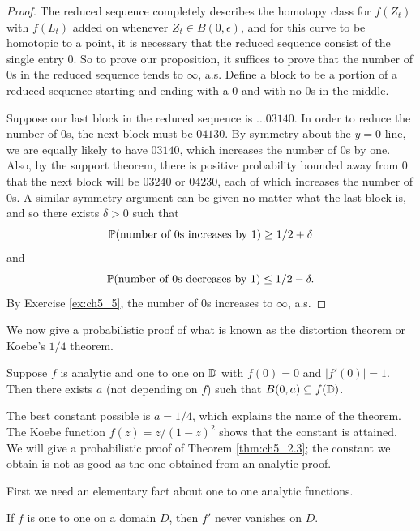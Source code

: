 \begin{proof}
The reduced sequence completely describes the homotopy class for $f(Z_t)$ with $f(L_t)$ added on whenever $Z_t \in B(0,\epsilon)$, and for this curve to be homotopic to a point, it is necessary that the reduced sequence consist of the single entry $0$. So to prove our proposition, it suffices to prove that the number of $0$s in the reduced sequence tends to $\infty$, a.s. Define a block to be a portion of a reduced sequence starting and ending with a $0$ and with no $0$s in the middle.

Suppose our last block in the reduced sequence is $\ldots 03140$. In order to reduce the number of $0$s, the next block must be $04130$. By symmetry about the $y = 0$ line, we are equally likely to have $03140$, which increases the number of $0$s by one. Also, by the support theorem, there is positive probability bounded away from $0$ that the next block will be $03240$ or $04230$, each of which increases the number of $0$s. A similar symmetry argument can be given no matter what the last block is, and so there exists $\delta > 0$ such that
\[
    \P(\text{number of $0$s increases by}~1) \geq 1/2 + \delta
\]
and
\[
    \P(\text{number of $0$s decreases by}~1) \leq 1/2 - \delta.
\]
By Exercise \ref{ex:ch5_5}, the number of 0s increases to $\infty$, a.s.
\end{proof}



We now give a probabilistic proof of what is known as the distortion theorem or Koebe's $1/4$ theorem.

\begin{theorem}\label{thm:ch5_2.3}
Suppose $f$ is analytic and one to one on $\D$ with $f(0) = 0$ and $|f'(0)| = 1$. Then there exists $a$ (not depending on $f$) such that $B(0,a) \subseteq \allowbreak f(\D)$.
\end{theorem}

The best constant possible is $a = 1/4$, which explains the name of the theorem. The Koebe function $f(z) = z/(1-z)^2$ shows that the constant is attained. We will give a probabilistic proof of Theorem \ref{thm:ch5_2.3}; the constant we obtain is not as good as the one obtained from an analytic proof.

First we need an elementary fact about one to one analytic functions.

\begin{lemma}\label{lem:ch5_2.4}
If $f$ is one to one on a domain $D$, then $f'$ never vanishes on $D$.
\end{lemma}

